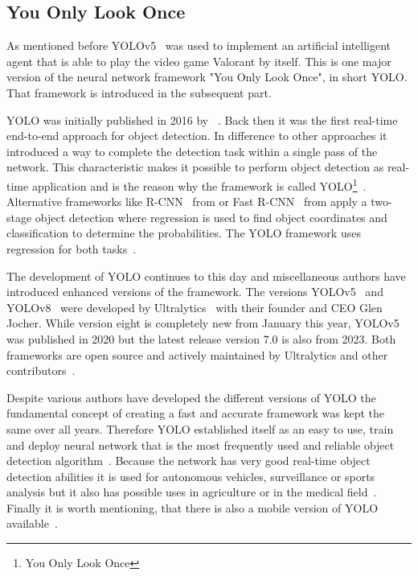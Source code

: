 \subsection[Neural Network Framework: You Only Look Once]{You Only Look 
Once}\label{subsec:intro:yolo}

As mentioned before YOLOv5~\cite{jocher2020} was used to implement an artificial intelligent agent 
that is able to play the video game Valorant by itself. This is one major version of the neural network 
framework "You Only Look Once", in short YOLO. That framework is introduced in the subsequent 
part.

YOLO was initially published in 2016 by \citeauthor{redmon2016}~\cite{redmon2016}. Back then it 
was the first real-time end-to-end approach for object detection. In difference to other approaches it 
introduced a way to complete the detection task within a single pass of the network. This 
characteristic makes it possible to perform object detection as real-time application and is the 
reason why the framework is called YOLO\footnote{You Only Look Once}~\cite{terven2023}. 
Alternative frameworks like R-CNN~\cite{girshick1994} from \citeyear{girshick1994} or Fast 
R-CNN~\cite{girshick2015} from \citeyear{girshick2015} apply a two-stage object detection where 
regression is used to find object coordinates and classification to determine the probabilities. The 
YOLO framework uses regression for both tasks~\cite{aydin2023, terven2023}.

The development of YOLO continues to this day and miscellaneous authors have introduced 
enhanced versions of the framework. The versions YOLOv5~\cite{jocher2020} and 
YOLOv8~\cite{jocher2023} were developed by Ultralytics~\cite{ultralytics} with their founder and 
CEO Glen Jocher. While version eight is completely new from January this year, YOLOv5 was 
published in 2020 but the latest release version 7.0 is also from 2023. Both frameworks are open 
source and actively maintained by Ultralytics and other contributors~\cite{terven2023}.

Despite various authors have developed the different versions of YOLO the fundamental concept of 
creating a fast and accurate framework was kept the same over all years. Therefore YOLO 
established itself as an easy to use, train and deploy neural network that is the most frequently used 
and reliable object detection algorithm~\cite{aydin2023, terven2023}. Because the network has very 
good real-time object detection abilities it is used for autonomous vehicles, surveillance or sports 
analysis but it also has possible uses in agriculture or in the medical 
field~\cite{terven2023, zheng2022}. Finally it is worth mentioning, that there is also a mobile version 
of YOLO available~\cite{terven2023}.
